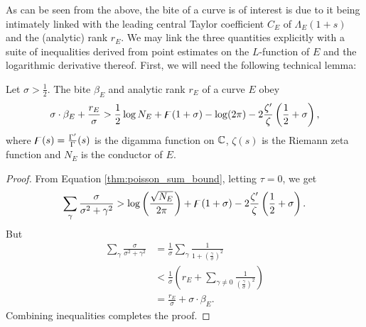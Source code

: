 As can be seen from the above, the bite of a curve is of interest is due to it being intimately linked with the leading central Taylor coefficient $C_E$ of $\Lambda_E(1+s)$ and the (analytic) rank $r_E$. We may link the three quantities explicitly with a suite of inequalities derived from point estimates on the $L$-function of $E$ and the logarithmic derivative thereof. First, we will need the following technical lemma:
\begin{lemma}[GRH]\label{lem:bite_rank_sigma_inequality}
Let $\sigma > \frac{1}{2}$. The bite $\beta_E$ and analytic rank $r_E$ of a curve $E$ obey
\begin{equation}
\sigma \cdot \beta_E + \frac{r_E}{\sigma} > \frac{1}{2} \log N_E + \digamma(1+\sigma)-\log(2\pi) - 2\frac{\zeta^{\prime}}{\zeta}\left(\frac{1}{2}+\sigma\right),
\end{equation}
where $\digamma(s) = \frac{\Gamma^{\prime}}{\Gamma}(s)$ is the digamma function on $\mathbb{C}$, $\zeta(s)$ is the Riemann zeta function and $N_E$ is the conductor of $E$.
\end{lemma}
\begin{proof}
From Equation \ref{thm:poisson_sum_bound}, letting $\tau=0$, we get
\begin{equation}
\sum_\gamma \frac{\sigma}{\sigma^2+\gamma^2} > \log\left(\frac{\sqrt{N_E}}{2\pi}\right) + \digamma(1+\sigma) - 2\frac{\zeta^{\prime}}{\zeta}\left(\frac{1}{2}+\sigma\right).
\end{equation}
But
\begin{align*}
\sum_\gamma \frac{\sigma}{\sigma^2+\gamma^2} &= \frac{1}{\sigma} \sum_\gamma \frac{1}{1+\left(\frac{\gamma}{\sigma}\right)^2} \\
&< \frac{1}{\sigma}\left(r_E + \sum_{\gamma\ne 0} \frac{1}{\left(\frac{\gamma}{\sigma}\right)^2} \right) \\
&= \frac{r_E}{\sigma} + \sigma\cdot \beta_E.
\end{align*}
Combining inequalities completes the proof.
\end{proof}


